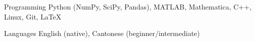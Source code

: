 

\begin{cvskills}
  \cvskill
    {Programming} %
    {Python (NumPy, SciPy, Pandas), MATLAB, Mathematica, C++, Linux, Git, LaTeX}


  \cvskill
    {Languages} %
    {English (native), Cantonese (beginner/intermediate)} %







\end{cvskills}
